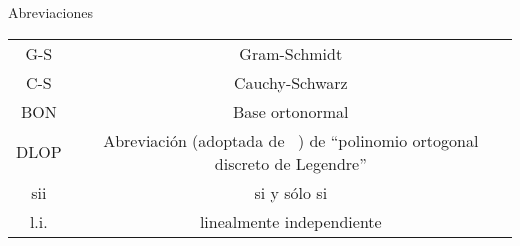 \vspace{0.5cm}

\begin{center}
\huge{Abreviaciones}
\end{center}

\vspace{0.5cm}

\begin{tabular}{ c c }
 G-S & Gram-Schmidt \\
 C-S & Cauchy-Schwarz \\
 BON & Base ortonormal \\
 DLOP & Abreviación (adoptada de ~\cite{Neuman})
 de ``polinomio ortogonal discreto de Legendre'' \\
 sii & si y sólo si \\
 l.i. & linealmente independiente
\end{tabular}




\newpage